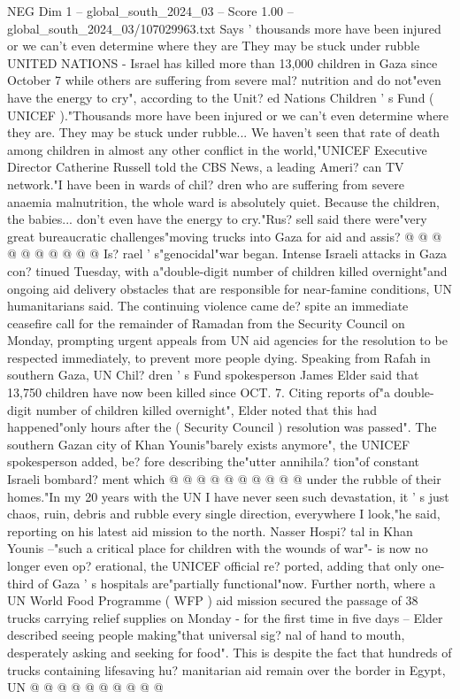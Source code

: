 \begin{textsample}{NEG Dim 1 – global\_south\_2024\_03 – Score 1.00 – global\_south\_2024\_03/107029963.txt}  \label{ex:f1_neg_111}
Says ' thousands more have been injured or we can't even determine where they are They may be stuck under rubble UNITED NATIONS - Israel has killed more than 13,000 children in Gaza since October 7 while others are suffering from severe mal? nutrition and do not"even have the energy to cry", according to the Unit? ed Nations Children ' s Fund ( UNICEF )."Thousands more have been injured or we can't even determine where they are.
They may be stuck under rubble...
We haven't seen that rate of death among children in almost any other conflict in the world,"UNICEF Executive Director Catherine Russell told the CBS News, a leading Ameri? can TV network."I have been in wards of chil? dren who are suffering from severe anaemia malnutrition, the whole ward is absolutely quiet.
Because the children, the babies... don't even have the energy to cry."Rus? sell said there were"very great bureaucratic challenges"moving trucks into Gaza for aid and assis? @ @ @ @ @ @ @ @ @ @ Is? rael ' s"genocidal"war began.
Intense Israeli attacks in Gaza con? tinued Tuesday, with a"double-digit number of children killed overnight"and ongoing aid delivery obstacles that are responsible for near-famine conditions, UN humanitarians said.
The continuing violence came de? spite an immediate ceasefire call for the remainder of Ramadan from the Security Council on Monday, prompting urgent appeals from UN aid agencies for the resolution to be respected immediately, to prevent more people dying.
Speaking from Rafah in southern Gaza, UN Chil? dren ' s Fund spokesperson James Elder said that 13,750 children have now been killed since OCT. 7.
Citing reports of"a double-digit number of children killed overnight", Elder noted that this had happened"only hours after the ( Security Council ) resolution was passed".
The southern Gazan city of Khan Younis"barely exists anymore", the UNICEF spokesperson added, be? fore describing the"utter annihila? tion"of constant Israeli bombard? ment which @ @ @ @ @ @ @ @ @ @ under the rubble of their homes."In my 20 years with the UN I have never seen such devastation, it ' s just chaos, ruin, debris and rubble every single direction, everywhere I look,"he said, reporting on his latest aid mission to the north.
Nasser Hospi? tal in Khan Younis --"such a critical place for children with the wounds of war"- is now no longer even op? erational, the UNICEF official re? ported, adding that only one-third of Gaza ' s hospitals are"partially functional"now.
Further north, where a UN World Food Programme ( WFP ) aid mission secured the passage of 38 trucks carrying relief supplies on Monday - for the first time in five days -- Elder described seeing people making"that universal sig? nal of hand to mouth, desperately asking and seeking for food".
This is despite the fact that hundreds of trucks containing lifesaving hu? manitarian aid remain over the border in Egypt, UN @ @ @ @ @ @ @ @ @ @

\end{textsample}
